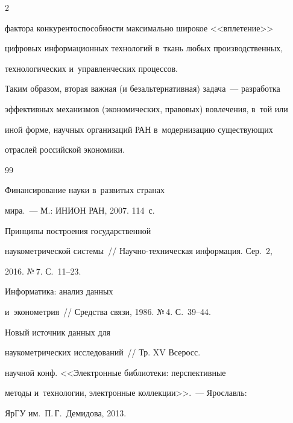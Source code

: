 \begin{multicols}{2}
\begin{enumerate}[1.]
фактора конкурентоспособности максимально широкое <<вплетение>> 

цифровых информационных технологий в~ткань любых производственных, 

технологических и~управленческих процессов.

    

    Таким образом, вторая важная (и безальтернативная) задача~--- разработка 

эффективных механизмов (экономических, правовых) вовлечения, в~той или 

иной форме, научных организаций РАН в~модернизацию существующих 

отраслей российской экономики. 

    \end{enumerate}

    

   {\small\frenchspacing

 {%


 \begin{thebibliography}{99}


 Финансирование науки в~развитых странах 

мира.~--- М.: ИНИОН РАН, 2007. 114~с.


 Принципы построения государственной 

наукометрической системы~// На\-уч\-но-тех\-ни\-че\-ская информация. Сер.~2, 

2016. №\,7. С.~11--23.




 Информатика: анализ данных 

и~эконометрия~// Средства связи, 1986. №\,4. С.~39--44. 


 Новый источник данных для 

наукометрических исследований~// Тр. XV Всеросс.  

научной конф. <<Электронные библиотеки: перспективные 

методы и~технологии, электронные коллекции>>.~--- Ярославль: 

ЯрГУ им.\ П.\,Г.~Демидова, 2013. 


\end{thebibliography}}}
\end{multicols}
